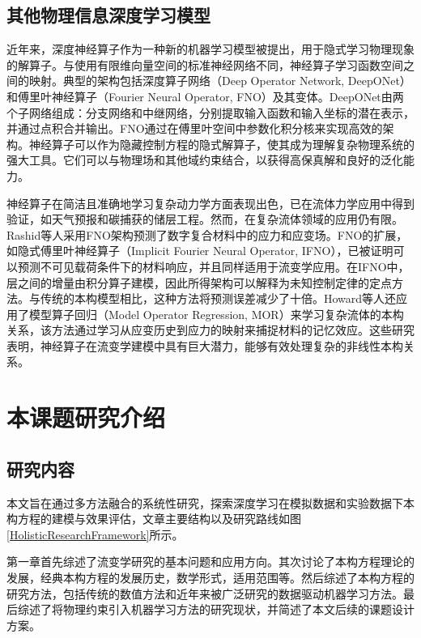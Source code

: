 \subsection{其他物理信息深度学习模型}
近年来，深度神经算子作为一种新的机器学习模型被提出，用于隐式学习物理现象的解算子\cite{luLearningNonlinearOperators2021}。与使用有限维向量空间的标准神经网络不同，神经算子学习函数空间之间的映射。典型的架构包括深度算子网络（Deep Operator Network, DeepONet）和傅里叶神经算子（Fourier Neural Operator, FNO）及其变体。DeepONet由两个子网络组成：分支网络和中继网络，分别提取输入函数和输入坐标的潜在表示，并通过点积合并输出。FNO通过在傅里叶空间中参数化积分核来实现高效的架构。神经算子可以作为隐藏控制方程的隐式解算子，使其成为理解复杂物理系统的强大工具。它们可以与物理场和其他域约束结合，以获得高保真解和良好的泛化能力。

神经算子在简洁且准确地学习复杂动力学方面表现出色，已在流体力学应用中得到验证，如天气预报和碳捕获的储层工程。然而，在复杂流体领域的应用仍有限。Rashid等人采用FNO架构预测了数字复合材料中的应力和应变场\cite{rashid2022learning}。FNO的扩展，如隐式傅里叶神经算子（Implicit Fourier Neural Operator, IFNO），已被证明可以预测不可见载荷条件下的材料响应，并且同样适用于流变学应用\cite{you2022learning}。在IFNO中，层之间的增量由积分算子建模，因此所得架构可以解释为未知控制定律的定点方法。与传统的本构模型相比，这种方法将预测误差减少了十倍。Howard等人还应用了模型算子回归（Model Operator Regression, MOR）来学习复杂流体的本构关系，该方法通过学习从应变历史到应力的映射来捕捉材料的记忆效应\cite{howardMachineLearningMethods2023}。这些研究表明，神经算子在流变学建模中具有巨大潜力，能够有效处理复杂的非线性本构关系。


\section{本课题研究介绍}
\subsection{研究内容}
本文旨在通过多方法融合的系统性研究，探索深度学习在模拟数据和实验数据下本构方程的建模与效果评估，文章主要结构以及研究路线如图\ref{HolisticResearchFramework}所示。

第一章首先综述了流变学研究的基本问题和应用方向。其次讨论了本构方程理论的发展，经典本构方程的发展历史，数学形式，适用范围等。然后综述了本构方程的研究方法，包括传统的数值方法和近年来被广泛研究的数据驱动机器学习方法。最后综述了将物理约束引入机器学习方法的研究现状，并简述了本文后续的课题设计方案。

